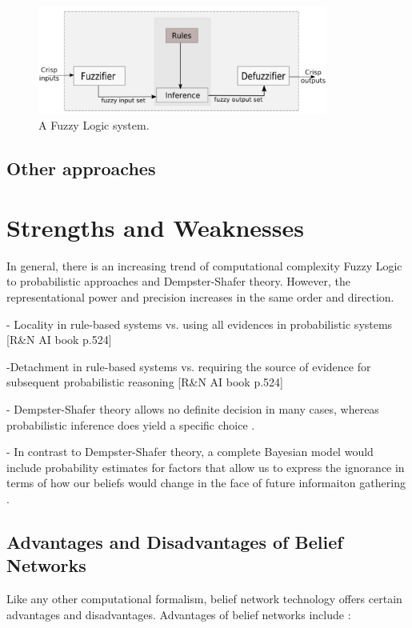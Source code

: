 \documentclass[11pt]{article}
\begin{document}
\begin{figure}[tbh]
  \center
  \includegraphics[width=0.85\textwidth]{figure/fuzzy-system.png}
  \caption{A Fuzzy Logic system.}
  \label{fig:fuzzy-system}
\end{figure}

\subsection{Other approaches}

\section{Strengths and Weaknesses}

In general, there is an increasing trend of computational complexity Fuzzy Logic
to probabilistic approaches and Dempster-Shafer theory. However, the
representational power and precision increases in the same order and direction.

- Locality in rule-based systems vs. using all evidences in probabilistic
systems [R\&N AI book p.524]

-Detachment in rule-based systems vs. requiring the source of evidence for
subsequent probabilistic reasoning [R\&N AI book p.524]

- Dempster-Shafer theory allows no definite decision in many cases, whereas
probabilistic inference does yield a specific choice \cite{russell:ai-modern}.

- In contrast to Dempster-Shafer theory, a complete Bayesian model would include
probability estimates for factors that allow us to express the ignorance in
terms of how our beliefs would change in the face of future informaiton
gathering \cite{russell:ai-modern}.

\subsection{Advantages and Disadvantages of Belief Networks}

Like any other computational formalism, belief network technology offers certain
advantages and disadvantages. Advantages of belief networks include
\cite{das:decision-making-agents}:
\end{document}
